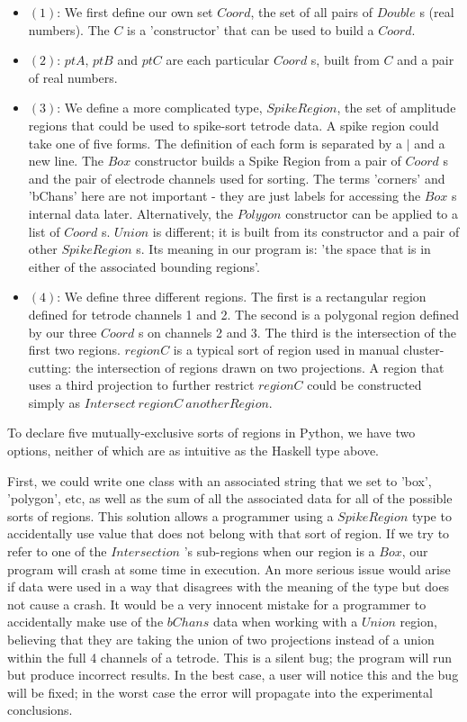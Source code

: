 \documentclass[]{article}
\begin{document}
\begin{itemize}
\item
  \((1)\): We first define our own set \(Coord\), the set of all pairs
  of \(Double\) s (real numbers). The \(C\) is a 'constructor' that can
  be used to build a \(Coord\).
\item
  \((2)\): \(ptA\), \(ptB\) and \(ptC\) are each particular \(Coord\) s,
  built from \(C\) and a pair of real numbers.
\item
  \((3)\): We define a more complicated type, \(SpikeRegion\), the set
  of amplitude regions that could be used to spike-sort tetrode data. A
  spike region could take one of five forms. The definition of each form
  is separated by a \(|\) and a new line. The \(Box\) constructor builds
  a Spike Region from a pair of \(Coord\) s and the pair of electrode
  channels used for sorting. The terms 'corners' and 'bChans' here are
  not important - they are just labels for accessing the \(Box\) s
  internal data later. Alternatively, the \(Polygon\) constructor can be
  applied to a list of \(Coord\) s. \(Union\) is different; it is built
  from its constructor and a pair of other \(SpikeRegion\) s. Its
  meaning in our program is: 'the space that is in either of the
  associated bounding regions'.
\item
  \((4)\): We define three different regions. The first is a rectangular
  region defined for tetrode channels 1 and 2. The second is a polygonal
  region defined by our three \(Coord\) s on channels 2 and 3. The third
  is the intersection of the first two regions. \(regionC\) is a typical
  sort of region used in manual cluster-cutting: the intersection of
  regions drawn on two projections. A region that uses a third
  projection to further restrict \(regionC\) could be constructed simply
  as \(Intersect\ regionC\ anotherRegion\).
\end{itemize}

\doublespacing

To declare five mutually-exclusive sorts of regions in Python, we have
two options, neither of which are as intuitive as the Haskell type
above.

First, we could write one class with an associated string that we set to
'box', 'polygon', etc, as well as the sum of all the associated data for
all of the possible sorts of regions. This solution allows a programmer
using a \(SpikeRegion\) type to accidentally use value that does not
belong with that sort of region. If we try to refer to one of the
\(Intersection\) 's sub-regions when our region is a \(Box\), our
program will crash at some time in execution. An more serious issue
would arise if data were used in a way that disagrees with the meaning
of the type but does not cause a crash. It would be a very innocent
mistake for a programmer to accidentally make use of the \(bChans\) data
when working with a \(Union\) region, believing that they are taking the
union of two projections instead of a union within the full 4 channels
of a tetrode. This is a silent bug; the program will run but produce
incorrect results. In the best case, a user will notice this and the bug
will be fixed; in the worst case the error will propagate into the
experimental conclusions.
\end{document}
